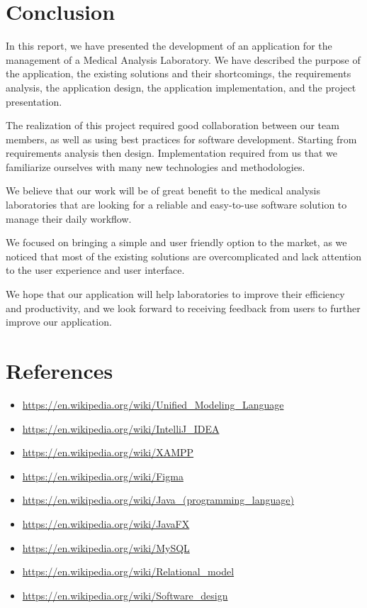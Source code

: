 \documentclass{article}
\begin{document}
\newpage

\section[Conclusion]{Conclusion}
In this report, we have presented the development of an application for the management of a Medical Analysis Laboratory. We have described the purpose of the application, the existing solutions and their shortcomings, the requirements analysis, the application design, the application implementation, and the project presentation.

The realization of this project required good collaboration between our team members, as well as using best practices for software development.
Starting from requirements analysis then design.
Implementation required from us that we familiarize ourselves with many new technologies and methodologies.

We believe that our work will be of great benefit to the medical analysis laboratories that are looking for a reliable and easy-to-use software solution to manage their daily workflow.

We focused on bringing a simple and user friendly option to the market, as we noticed that most of the existing solutions are overcomplicated and lack attention to the user experience and user interface.

We hope that our application will help laboratories to improve their efficiency and productivity, and we look forward to receiving feedback from users to further improve our application.

\newpage

\section[References]{References}

\begin{itemize}
    \item \url{https://en.wikipedia.org/wiki/Unified_Modeling_Language}
    \item \url{https://en.wikipedia.org/wiki/IntelliJ_IDEA}
    \item \url{https://en.wikipedia.org/wiki/XAMPP}
    \item \url{https://en.wikipedia.org/wiki/Figma}
    \item \url{https://en.wikipedia.org/wiki/Java\_(programming\_language)}
    \item \url{https://en.wikipedia.org/wiki/JavaFX}
    \item \url{https://en.wikipedia.org/wiki/MySQL}
    \item \url{https://en.wikipedia.org/wiki/Relational_model}
    \item \url{https://en.wikipedia.org/wiki/Software_design}    
\end{itemize}
\end{document}
